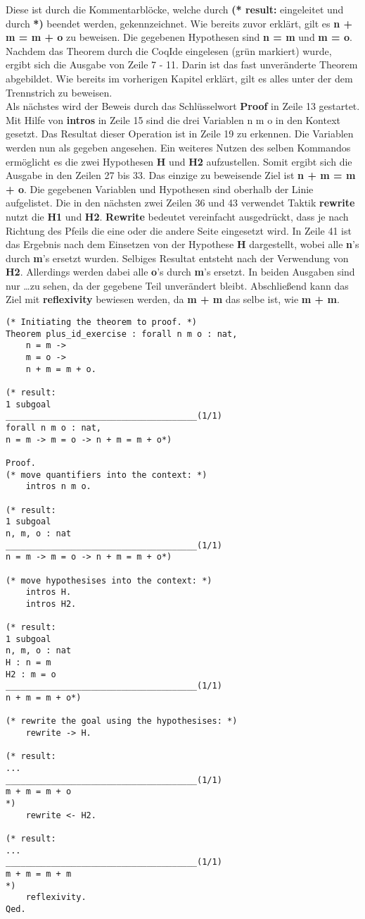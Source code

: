 Diese ist durch die Kommentarblöcke, welche durch \textbf{(* result:} eingeleitet und durch \textbf{*)} beendet werden, gekennzeichnet.
Wie bereits zuvor erklärt, gilt es \textbf{n + m = m + o} zu beweisen. Die gegebenen Hypothesen sind \textbf{n = m} und \textbf{m = o}. Nachdem das Theorem durch die CoqIde eingelesen (grün markiert) wurde, ergibt sich die Ausgabe von Zeile 7 - 11. Darin ist das fast unveränderte Theorem abgebildet. Wie bereits im vorherigen Kapitel erklärt, gilt es alles unter der dem Trennstrich zu beweisen.\\
Als nächstes wird der Beweis durch das Schlüsselwort \textbf{Proof} in Zeile 13 gestartet. Mit Hilfe von \textbf{intros} in Zeile 15 sind die drei Variablen n m o in den Kontext gesetzt. Das Resultat dieser Operation ist in Zeile 19 zu erkennen. Die Variablen werden nun als gegeben angesehen. Ein weiteres Nutzen des selben Kommandos ermöglicht es die zwei Hypothesen \textbf{H} und \textbf{H2} aufzustellen. Somit ergibt sich die Ausgabe in den Zeilen 27 bis 33. Das einzige zu beweisende Ziel ist \textbf{n + m = m + o}. Die gegebenen Variablen und Hypothesen sind oberhalb der Linie aufgelistet. Die in den nächsten zwei Zeilen 36 und 43 verwendet Taktik \textbf{rewrite} nutzt die \textbf{H1} und \textbf{H2}.
\textbf{Rewrite} bedeutet vereinfacht ausgedrückt, dass je nach Richtung des Pfeils die eine oder die andere Seite eingesetzt wird. In Zeile 41 ist das Ergebnis nach dem Einsetzen von der Hypothese \textbf{H} dargestellt, wobei alle \textbf{n}'s durch \textbf{m}'s ersetzt wurden. Selbiges Resultat entsteht nach der Verwendung von \textbf{H2}. Allerdings werden dabei alle \textbf{o}'s durch \textbf{m}'s ersetzt. In beiden Ausgaben sind nur \dots zu sehen, da der gegebene Teil unverändert bleibt.
Abschließend kann das Ziel mit \textbf{reflexivity} bewiesen werden, da \textbf{m + m} das selbe ist, wie \textbf{m + m}.

\begin{lstlisting}[language=coq,firstnumber=1,caption=Coq Beispielbeweis,label=lst:sample-proof2]
(* Initiating the theorem to proof. *)
Theorem plus_id_exercise : forall n m o : nat,
	n = m ->
	m = o ->
	n + m = m + o.
	
(* result: 
1 subgoal
______________________________________(1/1)
forall n m o : nat,
n = m -> m = o -> n + m = m + o*)

Proof.
(* move quantifiers into the context: *)
	intros n m o. 
	
(* result: 
1 subgoal
n, m, o : nat
______________________________________(1/1)
n = m -> m = o -> n + m = m + o*)

(* move hypothesises into the context: *)	
	intros H.
	intros H2.

(* result: 
1 subgoal
n, m, o : nat
H : n = m
H2 : m = o
______________________________________(1/1)
n + m = m + o*)

(* rewrite the goal using the hypothesises: *)
	rewrite -> H.

(* result: 
...
______________________________________(1/1)
m + m = m + o
*)
	rewrite <- H2.

(* result:
...
______________________________________(1/1)
m + m = m + m
*)
	reflexivity.
Qed.
\end{lstlisting}

